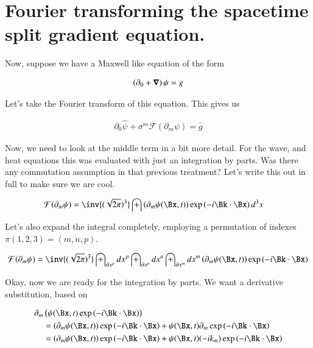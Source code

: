 \documentclass{article}
\newcommand{\FF}[0]{\mathcal{F}}
\begin{document}
\section{ Fourier transforming the spacetime split gradient equation. }

Now, suppose we have a Maxwell like equation of the form

\begin{align}\label{eqn:spacetimeGradientEquation}
\left(\partial_0 + \boldsymbol{\nabla} \right) \psi = g
\end{align}

Let's take the Fourier transform of this equation.  This gives us

\begin{align*}
\partial_0 \hat{\psi} + \sigma^m \FF(\partial_m \psi) = \hat{g}
\end{align*}

Now, we need to look at the middle term in a bit more detail.  For the wave, and heat equations this was evaluated with just an integration
by parts.  Was there any commutation assumption in that previous treatment?  Let's write this out in full to make sure we are cool.

\begin{align*}
\FF(\partial_m \psi) 
&= \inv{(\sqrt{2\pi})^3} \int \left(\partial_m \psi(\Bx, t)\right) \exp\left( -i \Bk \cdot \Bx \right) d^3 x 
\end{align*}

Let's also expand the integral completely, employing a permutation of indexes $\pi(1,2,3) = (m,n,p)$.

\begin{align*}
\FF(\partial_m \psi) 
&= 
\inv{(\sqrt{2\pi})^3} 
\int_{\partial x^p} dx^p
\int_{\partial x^n} dx^n
\int_{\partial x^m} dx^m
\left(\partial_m \psi(\Bx, t)\right) \exp\left( -i \Bk \cdot \Bx \right) \\
\end{align*}

Okay, now we are ready for the integration by parts.  We want a derivative substitution, based on

\begin{align*}
\partial_m &\left( \psi(\Bx, t) \exp\left( -i \Bk \cdot \Bx \right) \right) \\
&= (\partial_m \psi(\Bx, t)) \exp\left( -i \Bk \cdot \Bx \right) + \psi(\Bx, t) \partial_m \exp\left( -i \Bk \cdot \Bx \right) \\
&= (\partial_m \psi(\Bx, t)) \exp\left( -i \Bk \cdot \Bx \right) + \psi(\Bx, t) ( -i k_m ) \exp\left( -i \Bk \cdot \Bx \right) \\
\end{align*}
\end{document}
